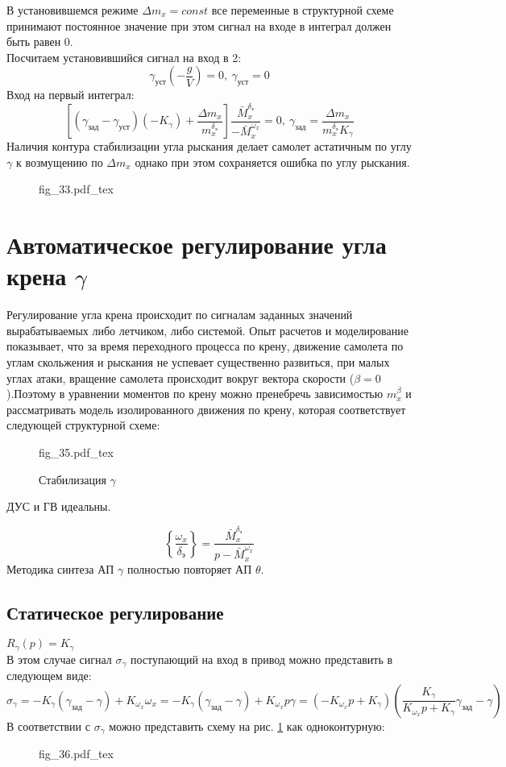 \documentclass{article}
\begin{document}
В установившемся режиме $\Delta m_x = const$ все переменные в структурной схеме принимают постоянное значение при этом сигнал на входе в интеграл должен быть равен 0.\\
Посчитаем установившийся сигнал на вход в 2:
\[
\gamma_{уст}(-\frac{g}{V}) = 0,\ \gamma_{уст} = 0 
\]
Вход на первый интеграл:
\[
\left[(\gamma_{зад} - \gamma_{уст})(-K_\gamma)+\frac{\Delta m_x}{m_x^{\delta_э}}\right]\frac{\bar{M}_x^{\delta_э}}{-\bar{M}_x^{\omega_x}}= 0,\ \gamma_{зад}=\frac{\Delta m_x}{m_x^{\delta_э}K_{\gamma}} 
\]
Наличия контура стабилизации угла рыскания делает самолет астатичным по углу $\gamma$ к возмущению по $\Delta m_x$ однако при этом сохраняется ошибка по углу рыскания.

\begin{figure}[H]
\centering
{fig_33.pdf_tex}
\end{figure}

\section{Автоматическое регулирование угла крена $\gamma$}
Регулирование угла крена происходит по сигналам заданных значений вырабатываемых либо летчиком, либо системой. Опыт расчетов и моделирование показывает, что за время переходного процесса по крену, движение самолета по углам скольжения и рыскания не успевает существенно развиться, при малых углах атаки, вращение самолета происходит вокруг вектора скорости ($\beta = 0$).Поэтому в уравнении моментов по крену можно пренебречь зависимостью $m_x^\beta$ и рассматривать модель изолированного движения по крену, которая соответствует следующей структурной схеме:

\begin{figure}[H]
\centering
{fig_35.pdf_tex}
\caption{Стабилизация $\gamma$}
\label{fig:stab_gamma}
\end{figure}
ДУС и ГВ идеальны.

\[
\left\{\frac{\omega_x}{\delta_э} \right\} =\frac{\bar{M}_x^{\delta_э}}{ p - \bar{M}_x^{\omega_x}} 
\]
Методика синтеза АП $\gamma$ полностью повторяет АП $\theta$.

\subsection{Статическое регулирование}
$R_\gamma(p) = K_\gamma$\\
В этом случае сигнал $\sigma_\gamma$ поступающий на вход в привод можно представить в следующем виде: 
\[
\sigma_\gamma =  - K_\gamma(\gamma_{зад} - \gamma) + K_{\omega_x} \omega_x = - K_{\gamma} (\gamma_{зад} - \gamma) + K_{\omega_x} p \gamma = (-K_{\omega_x} p + K_\gamma) \left(\frac{K_\gamma}{K_{\omega_x}p + K_\gamma} \gamma_{зад} - \gamma \right)
\]
В соответствии с $\sigma_\gamma$ можно представить схему на рис. \ref{fig:stab_gamma} как одноконтурную:\\
\begin{figure}[H]
    \centering
    {fig_36.pdf_tex}
\end{figure}
\end{document}
